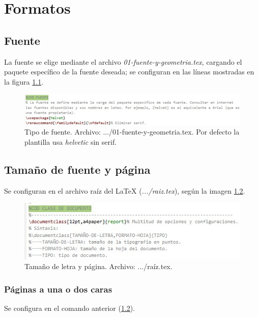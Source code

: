 \chapter{Formatos}
%
\section{Fuente}
La fuente se elige mediante el archivo \textit{01-fuente-y-geometria.tex}, cargando el paquete específico de la fuente deseada; se configuran en las líneas mostradas en la figura \ref{fig:fuente}.
	\begin{figure}[H]
		\centering
		\includegraphics[width=1\linewidth, frame]{cuerpo/cap-redaccion/imagenes/fuente}
		\caption[Tipo de fuente.]{Tipo de fuente. Archivo: .../01-fuente-y-geometria.tex. Por defecto la plantilla usa \textit{helvetic} sin serif.}
		\label{fig:fuente}
	\end{figure}
%
\section{Tamaño de fuente y página}
Se configuran en el archivo raíz del \LaTeX{} (\textit{.../raiz.tex}), según la imagen \ref{fig:fuente-tamano}.
\begin{figure}[H]
	\centering
	\includegraphics[width=1\linewidth, frame]{cuerpo/cap-redaccion/imagenes/fuente-tamano}
	\caption[Tamaño de letra y página.]{Tamaño de letra y página. Archivo: .../raíz.tex.}
	\label{fig:fuente-tamano}
\end{figure}
%
\subsection{Páginas a una o dos caras}
Se configura en el comando anterior (\ref{fig:fuente-tamano}).
%
